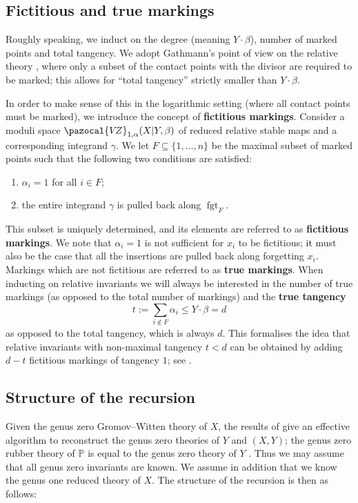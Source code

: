 \documentclass[11pt]{amsart}
\newcommand{\VZ}{\pazocal{V\!Z}}
\newcommand{\fgt}{\operatorname{fgt}}
\theoremstyle{definition}
\theoremstyle{definition}
\begin{document}
\subsection{Fictitious and true markings} Roughly speaking, we induct on the degree (meaning $Y\cdot\beta$), number of marked points and total tangency. We adopt Gathmann's point of view on the relative theory \cite{Ga}, where only a subset of the contact points with the divisor are required to be marked; this allows for ``total tangency'' strictly smaller than $Y\cdot\beta$.

In order to make sense of this in the logarithmic setting (where all contact points must be marked), we introduce the concept of \textbf{fictitious markings}. Consider a moduli space $\VZ_{1,\alpha}(X|Y,\beta)$ of reduced relative stable maps and a corresponding integrand $\gamma$. We let $F \subseteq \{1,\ldots,n\}$ be the maximal subset of marked points such that the following two conditions are satisfied:
\begin{enumerate}
\item $\alpha_i = 1$ for all $i \in F$;
\item the entire integrand $\gamma$ is pulled back along $\fgt_F$.
\end{enumerate}
This subset is uniquely determined, and its elements are referred to as \textbf{fictitious markings}. We note that $\alpha_i=1$ is not sufficient for $x_i$ to be fictitious; it must also be the case that all the insertions are pulled back along forgetting $x_i$. Markings which are not fictitious are referred to as \textbf{true markings}. When inducting on relative invariants we will always be interested in the number of true markings (as opposed to the total number of markings) and the \textbf{true tangency}
\begin{equation*} t:= \sum_{i \not\in F} \alpha_i \leq Y\cdot \beta =d\end{equation*}
as opposed to the total tangency, which is always $d$. This formalises the idea that relative invariants with non-maximal tangency $t<d$ can be obtained by adding $d-t$ fictitious markings of tangency $1$; see \cite[Lemma 1.15(i)]{Ga}.

\subsection{Structure of the recursion} Given the genus zero Gromov--Witten theory of $X$, the results of \cite{Ga} give an effective algorithm to reconstruct the genus zero theories of $Y$ and $(X,Y)$; the genus zero rubber theory of $\mathbb{P}$ is equal to the genus zero theory of $Y$ \cite{GathmannThesis}. Thus we may assume that all genus zero invariants are known. We assume in addition that we know the genus one reduced theory of $X$. The structure of the recursion is then as follows:\bigskip
\end{document}
